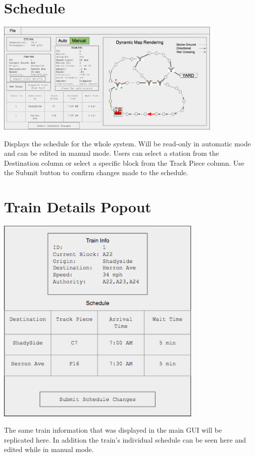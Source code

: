 \documentclass{scrreprt}
\begin{document}
\section{Schedule}
\begin{center}
  \includegraphics[trim={.45cm .08cm 18.7cm 11.15cm},clip,width=11cm]{CTC-main}
\end{center}
Displays the schedule for the whole system. Will be read-only in automatic mode and can be 
edited in manual mode. Users can select a station from the Destination column or select a specific 
block from the Track Piece column. Use the Submit button to confirm changes made to the schedule.

\section{Train Details Popout}
\begin{center}
  \includegraphics[width=10cm]{CTC-pop}
\end{center}
The same train information that was displayed in the main GUI will be replicated here. In 
addition the train's individual schedule can be seen here and edited while in manual mode.
\end{document}
